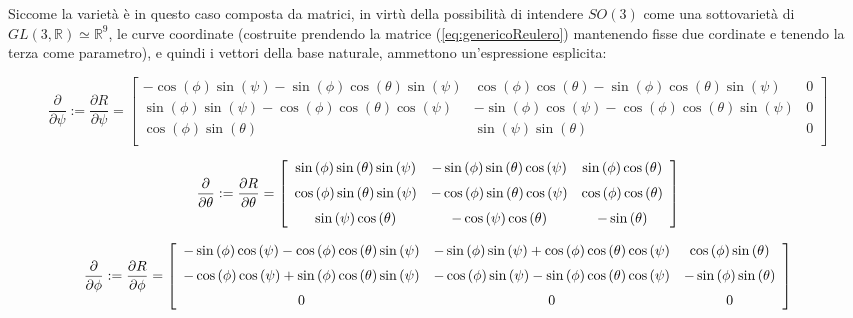 \documentclass[11pt]{report}
\theoremstyle{plain}
\theoremstyle{definition}
\theoremstyle{remark}
\begin{document}
Siccome la varietà è in questo caso composta da matrici, in virtù della possibilità di intendere $SO(3)$ come una sottovarietà di $GL(3,\mathbb{R}) \simeq \mathbb{R}^{9}$, le curve coordinate (costruite prendendo la matrice (\ref{eq:genericoReulero}) mantenendo fisse due cordinate e tenendo la terza come parametro), e quindi i vettori della base naturale, ammettono un'espressione esplicita:

\begin{displaymath}
\dfrac{\partial}{\partial \psi} := \dfrac{\partial R}{\partial \psi} = \left[ \begin{array}{ccc}
-\cos(\phi) \sin(\psi) - \sin(\phi) \cos(\theta) \sin(\psi) & \cos(\phi)\cos(\theta) -\sin(\phi)\cos(\theta)\sin(\psi) & 0  \\
\sin(\phi) \sin(\psi) - \cos(\phi) \cos(\theta) \cos(\psi) & - \sin(\phi)\cos(\psi) -\cos(\phi)\cos(\theta)\sin(\psi) & 0  \\
\cos(\phi)\sin(\theta) & \sin(\psi)\sin(\theta) & 0 \\
\end{array} \right]
\end{displaymath}

\begin{displaymath}
\dfrac{\partial}{\partial \theta} := \dfrac{\partial R}{\partial \theta} = \left[ \begin {array}{ccc} \sin \left( \phi \right) \sin \left( \theta \right) \sin \left( \psi \right) &-\sin \left( \phi \right) \sin \left( \theta \right) \cos \left( \psi \right) &\sin \left( \phi \right) \cos \left( \theta \right) \\ \noalign{\medskip}\cos \left( \phi \right) \sin \left( \theta \right) \sin \left( \psi \right) &-\cos \left( \phi \right) \sin \left( \theta \right) \cos \left( \psi \right) &\cos \left( \phi \right) \cos \left( \theta \right) \\ \noalign{\medskip}\sin \left( \psi \right) \cos \left( \theta \right) &-\cos \left( \psi \right) \cos \left( \theta \right) &-\sin \left( \theta \right) \end {array} \right]
\end{displaymath}

\begin{displaymath}
\dfrac{\partial}{\partial \phi} := \dfrac{\partial R}{\partial \phi} = \left[ \begin {array}{ccc} -\sin \left( \phi \right) \cos \left( \psi \right) -\cos \left( \phi \right) \cos \left( \theta \right) \sin \left( \psi \right) &-\sin \left( \phi \right) \sin \left( \psi \right) +\cos \left( \phi \right) \cos \left( \theta \right) \cos \left( \psi \right) &\cos \left( \phi \right) \sin \left( \theta \right) \\ \noalign{\medskip}-\cos \left( \phi \right) \cos \left( \psi \right) +\sin \left( \phi \right) \cos \left( \theta \right) \sin \left( \psi \right) &-\cos \left( \phi \right) \sin \left( \psi \right) -\sin \left( \phi \right) \cos \left( \theta \right) \cos \left( \psi \right) &-\sin \left( \phi \right) \sin \left( \theta \right) \\ \noalign{\medskip}0&0&0\end {array} \right]
\end{displaymath}
\end{document}
